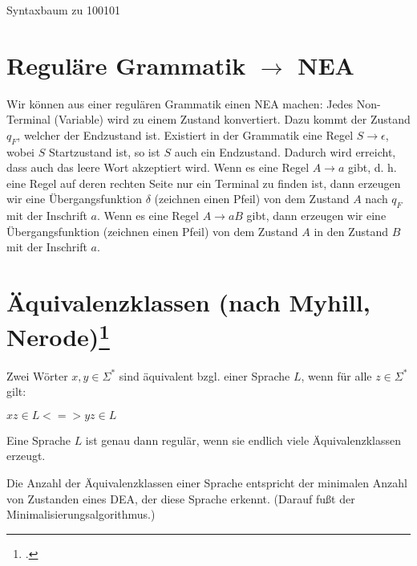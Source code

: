 \documentclass{lehramt-informatik-haupt}
\begin{document}
Syntaxbaum zu 100101
\begin{center}
\end{center}

%

\section{Reguläre Grammatik $\rightarrow$ NEA}

Wir können aus einer regulären Grammatik einen NEA machen: Jedes
Non-Terminal (Variable) wird zu einem Zustand konvertiert. Dazu kommt
der Zustand $q_{F}$, welcher der Endzustand ist. Existiert in der
Grammatik eine Regel $S \rightarrow \epsilon$, wobei $S$ Startzustand
ist, so ist $S$ auch ein Endzustand. Dadurch wird erreicht, dass auch
das leere Wort akzeptiert wird. Wenn es eine Regel $A \rightarrow a$
gibt, d. h. eine Regel auf deren rechten Seite nur ein Terminal zu
finden ist, dann erzeugen wir eine Übergangsfunktion $\delta$ (zeichnen
einen Pfeil) von dem Zustand $A$ nach $q_{F}$ mit der Inschrift $a$.
Wenn es eine Regel $A\rightarrow aB$ gibt, dann erzeugen wir eine
Übergangsfunktion (zeichnen einen Pfeil) von dem Zustand $A$ in den
Zustand $B$ mit der Inschrift $a$.

%

\section{Äquivalenzklassen (nach Myhill, Nerode)\footcite{theo:fs:}}

Zwei Wörter $x, y \in \Sigma^*$ sind äquivalent bzgl. einer Sprache $L$,
wenn für alle $z \in Σ^*$ gilt:

$xz \in L <=> yz \in L$

Eine Sprache $L$ ist genau dann regulär, wenn sie endlich viele
Äquivalenzklassen erzeugt.

Die Anzahl der Äquivalenzklassen einer Sprache entspricht der
minimalen Anzahl von Zustanden eines DEA, der diese Sprache
erkennt. (Darauf fußt der Minimalisierungsalgorithmus.)
\end{document}
